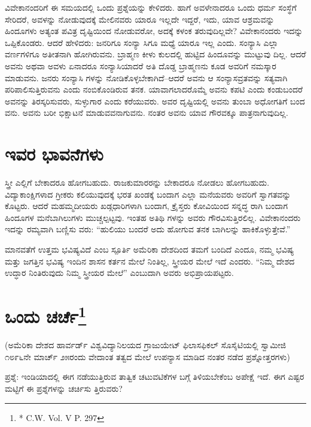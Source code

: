 ವಿವೇಕಾನಂದರಿಗೆ ಈ ಸಮಯದಲ್ಲಿ ಒಂದು ಪ್ರಶ್ನೆಯನ್ನು ಕೇಳಿದರು. ಹಾಗೆ ಅವಳೇನಾದರೂ ಒಂದು ಧರ್ಮ ಸಂಸ್ಥೆಗೆ ಸೇರಿದರೆ, ಅವಳನ್ನು ನೋಡುವುದಕ್ಕೆ ಮೇಲಿನವರು ಯಾರೂ ಇಲ್ಲದೇ ಇದ್ದರೆ, ಇದು, ಯಾವ ಆಶ್ರಮವನ್ನು ಹಿಂದೂಗಳು ಅತ್ಯಂತ ಪವಿತ್ರ ದೃಷ್ಟಿಯಿಂದ ನೋಡುವರೋ, ಅದಕ್ಕೆ ಕಳಂಕ ತರುವುದಿಲ್ಲವೇ? ವಿವೇಕಾನಂದರು ಇದನ್ನು ಒಪ್ಪಿಕೊಂಡರು. ಆದರೆ ಹೇಳಿದರು: ಜನರಿಗೂ ಸಂನ್ಯಾ ಸಿಗೂ ಮಧ್ಯೆ ಯಾರೂ ಇಲ್ಲ ಎಂದು. ಸಂನ್ಯಾಸಿ ಎಲ್ಲಾ ವರ್ಣಗಳಿಗೂ ಅತೀತನಾಗಿ ಹೋಗಿರುವನು. ಬ್ರಾಹ್ಮಣ ಕೀಳು ಕುಲದಲ್ಲಿ ಹುಟ್ಟಿದ ಹಿಂದೂವನ್ನು ಮುಟ್ಟುವು ದಿಲ್ಲ. ಆದರೆ ಅವನು ಅಥವಾ ಅವಳು ಏನಾದರೂ ಸಂನ್ಯಾಸಿಯಾದರೆ ಅತಿ ದೊಡ್ಡ ಬ್ರಾಹ್ಮಣನು ಕೂಡ ಅವರಿಗೆ ನಮಸ್ಕಾರ ಮಾಡುವನು. ಜನರು ಸಂನ್ಯಾಸಿ ಗಳನ್ನು ನೋಡಿಕೊಳ್ಳಬೇಕಾಗಿದೆ–ಆದರೆ ಅವನು ಆ ಸಂನ್ಯಾಸವ್ರತವನ್ನು ಸತ್ಯವಾಗಿ ಪರಿಪಾಲಿಸುತ್ತಿರುವನು ಎಂದು ನಂಬಿಕೊಂಡಿರುವ ತನಕ. ಯಾವಾಗಲಾದರೊಮ್ಮೆ ಅವನು ಕಪಟಿ ಎಂದು ಕಂಡುಬಂದರೆ ಅವನನ್ನು ತಿರಸ್ಕರಿಸುವರು, ಸುಳ್ಳುಗಾರ ಎಂದು ಕರೆಯುವರು. ಅವರ ದೃಷ್ಟಿಯಲ್ಲಿ ಅವನು ತುಂಬಾ ಅಧೋಗತಿಗೆ ಬಂದ ವನು. ಅವನು ಬರೀ ಭಿಕ್ಷಾಟನೆ ಮಾಡುವವನಾಗುವನು. ನಂತರ ಅವನು ಯಾವ ಗೌರವಕ್ಕೂ ಪಾತ್ರನಾಗುವುದಿಲ್ಲ.


\section{ಇವರ ಭಾವನೆಗಳು}

ಸ್ತ್ರೀ ಎಲ್ಲಿಗೆ ಬೇಕಾದರೂ ಹೋಗಬಹುದು. ರಾಜಕುಮಾರರನ್ನು ಬೇಕಾದರೂ ನೋಡಲು ಹೋಗಬಹುದು. ವಿದ್ಯಾಕಾಂಕ್ಷಿಗಳಾದ ಗ್ರೀಕರು ಕಲಿಯುವುದಕ್ಕೆ ಭರತ ಖಂಡಕ್ಕೆ ಬಂದಾಗ ಎಲ್ಲಾ ಮನೆಯವರು ಅವರಿಗೆ ಸ್ವಾಗತವನ್ನು ಕೊಟ್ಟರು. ಆದರೆ ಮಹಮ್ಮದೀಯರು ಖಡ್ಗಧಾರಿಗಳಾಗಿ ಬಂದಾಗ, ಕ್ರೈಸ್ತರು ಕೋವಿಯಿಂದ ಸನ್ನದ್ಧ ರಾಗಿ ಬಂದಾಗ ಹಿಂದೂಗಳ ಮನೆಬಾಗಿಲುಗಳು ಮುಚ್ಚಲ್ಪಟ್ಟವು. ಇಂತಹ ಅತಿಥಿ ಗಳನ್ನು ಅವರು ಗೌರವಿಸುತ್ತಿರಲಿಲ್ಲ. ವಿವೇಕಾನಂದರು ಇದನ್ನು ರಮ್ಯವಾಗಿ ಬಣ್ಣಿಸು ವರು: “ಹುಲಿಯು ಬಂದರೆ ಅದು ಹೋಗುವ ತನಕ ಬಾಗಿಲನ್ನು ಹಾಕಿಕೊಳ್ಳುತ್ತೇವೆ.”

ಮಾನವತೆಗೆ ಉತ್ತಮ ಭವಿಷ್ಯವಿದೆ ಎಂಬ ಸ್ಪೂರ್ತಿ ಅಮೆರಿಕಾ ದೇಶದಿಂದ ತಮಗೆ ಬಂದಿದೆ ಎಂದೂ, ನಮ್ಮ ಭವಿಷ್ಯ ಮತ್ತು ಜಗತ್ತಿನ ಭವಿಷ್ಯ ಇಂದಿನ ಶಾಸನ ಕರ್ತನ ಮೇಲೆ ನಿಂತಿಲ್ಲ, ಸ್ತ್ರೀಯರ ಮೇಲೆ ಇದೆ ಎಂದರು. “ನಿಮ್ಮ ದೇಶದ ಉದ್ಧಾರ ನಿಂತಿರುವುದು ನಿಮ್ಮ ಸ್ತ್ರೀಯರ ಮೇಲೆ” ಎಂಬುದಾಗಿ ಅವರು ಅಭಿಪ್ರಾಯಪಟ್ಟರು.


\section[ಒಂದು ಚರ್ಚೆ]{ಒಂದು ಚರ್ಚೆ\protect\footnote{* C.W. Vol. V P. 297}}

\begin{center}
(ಅಮೆರಿಕಾ ದೇಶದ ಹಾರ್ವರ್ಡ್​ ವಿಶ್ವವಿದ್ಯಾನಿಲಯದ ಗ್ರಾಜುಯೇಟ್​ ಫಿಲಾಸಫಿಕಲ್​ ಸೊಸೈಟಿಯಲ್ಲಿ ಸ್ವಾಮೀಜಿ ೧೮೯೬ನೇ ಮಾರ್ಚ್​ ೨೫ರಂದು ವೇದಾಂತ ತತ್ವದ ಮೇಲೆ ಉಪನ್ಯಾಸ ಮಾಡಿದ ನಂತರ ನಡೆದ ಪ್ರಶ್ನೋತ್ತರಗಳು)
\end{center}

ಪ್ರಶ್ನೆ: ಇಂಡಿಯಾದಲ್ಲಿ ಈಗ ನಡೆಯುತ್ತಿರುವ ತಾತ್ವಿಕ ಚಟುವಟಿಕೆಗಳ ಬಗ್ಗೆ ತಿಳಿಯಬೇಕೆಂಬ ಅಪೇಕ್ಷೆ ಇದೆ. ಈಗ ಎಷ್ಟರ ಮಟ್ಟಿಗೆ ಈ ಪ್ರಶ್ನೆಗಳನ್ನು ಚರ್ಚಿಸು ತ್ತಿರುವರು?

